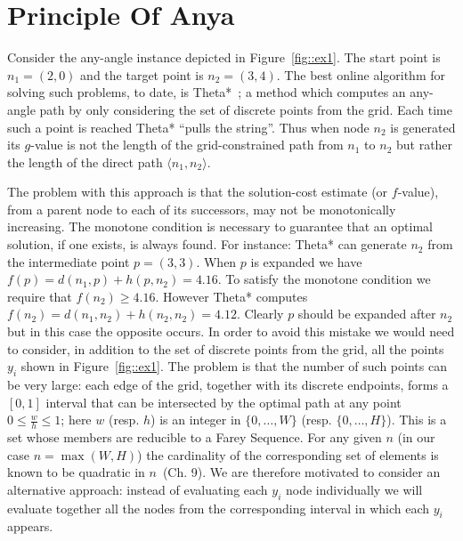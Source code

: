 \section{Principle Of Anya}
Consider the any-angle instance depicted in Figure~\ref{fig::ex1}. 
The start point is$n_1 = (2, 0)$ and the target
point is $n_2 = (3, 4)$.  The best online algorithm for solving such
problems, to date, is Theta*~\cite{nash07}; a method which computes
an any-angle path by only considering the set of discrete points from 
the grid. 
Each time such a point is reached Theta* ``pulls the string''.  
Thus when node $n_2$ is generated its $g$-value is not
the length of the grid-constrained path from $n_1$ to $n_2$
but rather the length of the direct path $\langle n_1, n_2 \rangle$.

%    

The problem with this approach is that the solution-cost estimate
(or $f$-value), from a parent node to each of its successors, may 
not be monotonically increasing.  The monotone condition is
necessary to guarantee that an optimal solution, if one exists, is always found.
For instance: Theta* can generate $n_2$ from the intermediate point $p = (3,3)$.
When $p$ is expanded we have $f(p) = d(n_1, p) + h(p, n_2) = 4.16$. 
To satisfy the monotone condition we require that $f(n_2) \geq 4.16$. However 
Theta* computes $f(n_2) = d(n_1, n_2) + h(n_2, n_2) = 4.12$.
Clearly $p$ should be expanded after $n_2$ but in this case the opposite occurs.  
In order to avoid this mistake we would need to consider, in addition to the
set of discrete points from the grid, all the points $y_i$ shown in Figure~\ref{fig::ex1}.
The problem is that the number of such points can be very large:
each edge of the grid, together with its discrete endpoints, 
forms a $[0, 1]$ interval that can be intersected by the optimal
path at any point $0 \leq \frac{w}{h} \leq 1$; here $w$ (resp. $h$) is an integer in
$\{0,\dots,W\}$ (resp.  $\{0,\dots,H\}$).
This is a set whose members are reducible to a Farey Sequence.
For any given $n$ (in our case $n = \max(W, H)$) the cardinality of the corresponding 
set of elements is known to be quadratic in $n$~\cite{concrete89}(Ch. 9).
We are therefore motivated to consider an alternative approach: instead
of evaluating each $y_i$ node individually we will evaluate together
all the nodes from the corresponding interval in which each $y_i$ appears.


